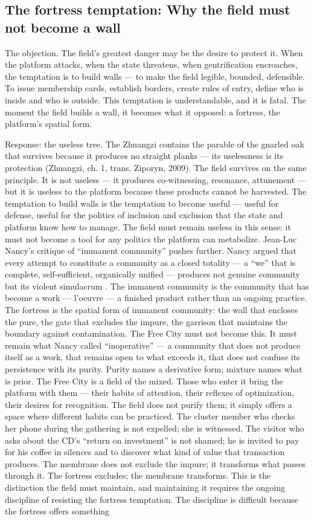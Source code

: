 \subsection{The fortress temptation: Why the field must not become a wall}

The objection. The field’s greatest danger may be the desire to protect it. When the platform attacks, when the state threatens, when gentrification encroaches, the temptation is to build walls — to make the field legible, bounded, defensible. To issue membership cards, establish borders, create rules of entry, define who is inside and who is outside. This temptation is understandable, and it is fatal. The moment the field builds a wall, it becomes what it opposed: a fortress, the platform’s spatial form.

Response: the useless tree. The Zhuangzi contains the parable of the gnarled oak that survives because it produces no straight planks — its uselessness is its protection (Zhuangzi, ch. 1, trans. Ziporyn, 2009). The field survives on the same principle. It is not useless — it produces co-witnessing, resonance, attunement — but it is useless to the platform because these products cannot be harvested. The temptation to build walls is the temptation to become useful — useful for defense, useful for the politics of inclusion and exclusion that the state and platform know how to manage. The field must remain useless in this sense: it must not become a tool for any politics the platform can metabolize. Jean-Luc Nancy’s critique of “immanent community” pushes further. Nancy argued that every attempt to constitute a community as a closed totality — a “we” that is complete, self-sufficient, organically unified — produces not genuine community but its violent simulacrum \cite[pp.~1--42]{nancy_1986}. The immanent community is the community that has become a work — l’oeuvre — a finished product rather than an ongoing practice. The fortress is the spatial form of immanent community: the wall that encloses the pure, the gate that excludes the impure, the garrison that maintains the boundary against contamination. The Free City must not become this. It must remain what Nancy called “inoperative” — a community that does not produce itself as a work, that remains open to what exceeds it, that does not confuse its persistence with its purity. Purity names a derivative form; mixture names what is prior. The Free City is a field of the mixed. Those who enter it bring the platform with them — their habits of attention, their reflexes of optimization, their desires for recognition. The field does not purify them; it simply offers a space where different habits can be practiced. The cluster member who checks her phone during the gathering is not expelled; she is witnessed. The visitor who asks about the CD’s “return on investment” is not shamed; he is invited to pay for his coffee in silences and to discover what kind of value that transaction produces. The membrane does not exclude the impure; it transforms what passes through it. The fortress excludes; the membrane transforms. This is the distinction the field must maintain, and maintaining it requires the ongoing discipline of resisting the fortress temptation. The discipline is difficult because the fortress offers something 